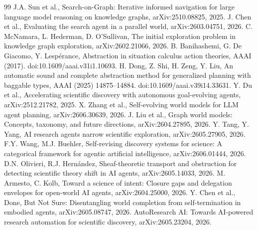 \documentclass[11pt]{article}
\begin{document}
\begin{thebibliography}{99}
 J.A. Sun et al., Search-on-Graph: Iterative informed navigation for large language model reasoning on knowledge graphs, arXiv:2510.08825, 2025.
 J. Chen et al., Evaluating the search agent in a parallel world, arXiv:2603.04751, 2026.
 C. McNamara, L. Hederman, D. O'Sullivan, The initial exploration problem in knowledge graph exploration, arXiv:2602.21066, 2026.
 B. Banihashemi, G. De Giacomo, Y. Lesp\'erance, Abstraction in situation calculus action theories, AAAI (2017). doi:10.1609/aaai.v31i1.10693.
 H. Dong, Z. Shi, H. Zeng, Y. Liu, An automatic sound and complete abstraction method for generalized planning with baggable types, AAAI (2025) 14875--14884. doi:10.1609/aaai.v39i14.33631.
 Y. Du et al., Accelerating scientific discovery with autonomous goal-evolving agents, arXiv:2512.21782, 2025.
 X. Zhang et al., Self-evolving world models for LLM agent planning, arXiv:2606.30639, 2026.
 J. Liu et al., Graph world models: Concepts, taxonomy, and future directions, arXiv:2604.27895, 2026.
 Y. Tang, Y. Yang, AI research agents narrow scientific exploration, arXiv:2605.27905, 2026.
 F.Y. Wang, M.J. Buehler, Self-revising discovery systems for science: A categorical framework for agentic artificial intelligence, arXiv:2606.01444, 2026.
 D.N. Olivieri, R.J. Hern\'andez, Sheaf-theoretic transport and obstruction for detecting scientific theory shift in AI agents, arXiv:2605.14033, 2026.
 M. Armesto, C. Kolb, Toward a science of intent: Closure gaps and delegation envelopes for open-world AI agents, arXiv:2604.25000, 2026.
 Y. Chen et al., Done, But Not Sure: Disentangling world completion from self-termination in embodied agents, arXiv:2605.08747, 2026.
 AutoResearch AI: Towards AI-powered research automation for scientific discovery, arXiv:2605.23204, 2026.
\end{thebibliography}
\end{document}
